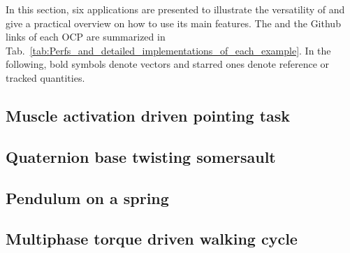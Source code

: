 In this section, six applications are presented to illustrate the versatility of \bioptim and give a practical overview on how to use its main features.
The  and the Github links of each OCP are summarized in Tab.~\ref{tab:Perfs_and_detailed_implementations_of_each_example}.
In the following, bold symbols denote vectors and starred ones denote reference or tracked quantities.


\subsection{Muscle activation driven pointing task}


\subsection{Quaternion base twisting somersault}


\subsection{Pendulum on a spring}


\subsection{Multiphase torque driven walking cycle}


